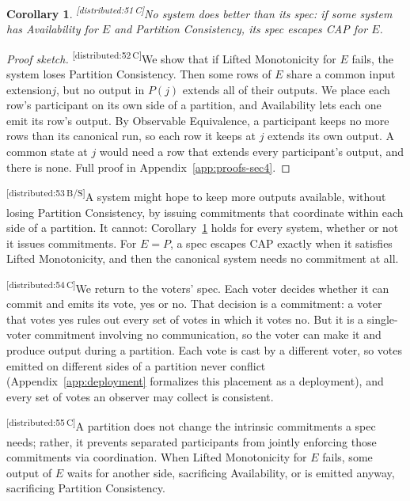\documentclass[sigconf]{cidr-2027}
\newtheorem{corollary}{Corollary}
\theoremstyle{remark}
\newcommand{\commitment}{commitment\xspace}
\newcommand{\commitments}{commitments\xspace}
\newcommand{\indesc}{input extension\xspace} %
\newcommand{\outrel}{extends\xspace}          %
\newcommand{\fiber}[1]{P(#1)}
\newcommand{\cxtag}[2]{\textsuperscript{\textsf{\tiny[#1\,#2]}}}
\begin{document}
\color{black!45}\begin{corollary}
\label{cor:complete-cap-any-system}
\cxtag{distributed:51}{C}No system does better than its spec: if some system has Availability for $E$
and Partition Consistency, its spec escapes CAP for $E$.\color{black}
\end{corollary}

\color{black!45}\begin{proof}[Proof sketch]
\cxtag{distributed:52}{C}We show that if Lifted Monotonicity for $E$ fails, the system loses Partition
Consistency.  Then some rows of $E$ share a common \indesc $j$, but no output in
$\fiber{j}$ \outrel all of their outputs.  We place each row's participant on
its own side of a partition, and Availability lets each one emit its row's
output.  By Observable Equivalence, a participant keeps no more rows than its
canonical run, so each row it keeps at $j$ \outrel its own output.  A common
state at $j$ would need a row that \outrel every participant's output, and
there is none.  Full proof in Appendix~\ref{app:proofs-sec4}.\color{black}
\end{proof}

\color{blue!75!black}\cxtag{distributed:53}{B/S}A system might hope to keep more outputs available, without losing Partition
Consistency, by issuing \commitments that coordinate within each side of a
partition.  It cannot: Corollary~\ref{cor:complete-cap-any-system} holds for
every system, whether or not it issues \commitments.  For
$E=P$, a spec escapes CAP exactly when it satisfies Lifted Monotonicity, and
then the canonical system needs no \commitment at all.\color{black}

\color{black!45}\cxtag{distributed:54}{C}We return to the voters' spec.  Each voter decides whether it can commit and emits
its vote, yes or no.  That decision is a \commitment: a voter that votes yes
rules out every set of votes in which it votes no.  But it is a single-voter
\commitment involving no communication, so the voter can make it and produce
output during a partition.  Each vote is cast by a different voter, so votes
emitted on different sides of a partition never conflict (Appendix~\ref{app:deployment} formalizes this placement as a deployment), and every
set of votes an observer may collect is consistent.\color{black}

\color{black!45}\cxtag{distributed:55}{C}A partition does not change the intrinsic \commitments a spec needs; rather,
it prevents separated participants from jointly enforcing those \commitments
via coordination.  When Lifted
Monotonicity for $E$ fails, some output of $E$ waits for another side,
sacrificing Availability, or is emitted anyway, sacrificing Partition
Consistency.\color{black}
\end{document}
